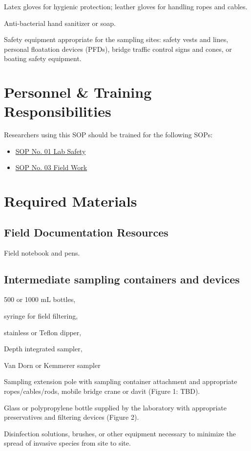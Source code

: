 \documentclass[12pt]{../SOP4_alpha}\usepackage[]{graphicx}\usepackage[]{xcolor}
\begin{document}
\NP Latex gloves for hygienic protection; leather gloves for handling ropes and cables.  

\NP Anti-bacterial hand sanitizer or soap.

\NP Safety equipment appropriate for the sampling sites: safety vests and lines, personal floatation devices (PFDs), bridge traffic control signs and cones, or boating safety equipment.  

\section{Personnel \& Training Responsibilities}

Researchers using this SOP should be trained for the following SOPs:

\begin{itemize}
  \item \href{https://github.com/marclos/SOPs/blob/master/01_Laboratory_Safety/Laboratory_Safety_v1.04.pdf}{SOP No. 01 Lab Safety}
  \item \href{https://github.com/marclos/SOPs/blob/master/03_Field_Safety/Field_Safety_v1.1.pdf}{SOP No. 03 Field Work}
\end{itemize}

\section{Required Materials}

\subsection{Field Documentation Resources}

\NP Field notebook and pens.  

\subsection{Intermediate sampling containers and devices}

\begin{itemize*}

\item 500 or 1000 mL bottles, 
\item syringe for field filtering, 
\item stainless or Teflon dipper, 
\item Depth integrated sampler, 
\item Van Dorn or Kemmerer sampler
\item Sampling extension pole with sampling container attachment and appropriate ropes/cables/rods, mobile bridge crane or davit  (Figure 1: TBD).  
\item Glass or polypropylene bottle supplied by the laboratory with appropriate preservatives and filtering devices (Figure 2).  

\item Disinfection solutions, brushes, or other equipment necessary to minimize the spread of invasive species from site to site. %

\end{itemize*}
\end{document}
